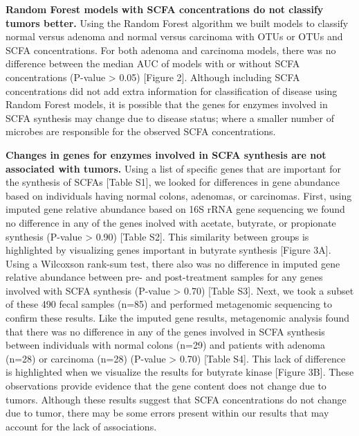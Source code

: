 \documentclass[11pt,]{article}
\begin{document}
\textbf{Random Forest models with SCFA concentrations do not classify
tumors better.} Using the Random Forest algorithm we built models to
classify normal versus adenoma and normal versus carcinoma with OTUs or
OTUs and SCFA concentrations. For both adenoma and carcinoma models,
there was no difference between the median AUC of models with or without
SCFA concentrations (P-value \textgreater{} 0.05) {[}Figure 2{]}.
Although including SCFA concentrations did not add extra information for
classification of disease using Random Forest models, it is possible
that the genes for enzymes involved in SCFA synthesis may change due to
disease status; where a smaller number of microbes are responsible for
the observed SCFA concentrations.

\textbf{Changes in genes for enzymes involved in SCFA synthesis are not
associated with tumors.} Using a list of specific genes that are
important for the synthesis of SCFAs {[}Table S1{]}, we looked for
differences in gene abundance based on individuals having normal colons,
adenomas, or carcinomas. First, using imputed gene relative abundance
based on 16S rRNA gene sequencing we found no difference in any of the
genes inolved with acetate, butyrate, or propionate synthesis (P-value
\textgreater{} 0.90) {[}Table S2{]}. This similarity between groups is
highlighted by visualizing genes important in butyrate synthesis
{[}Figure 3A{]}. Using a Wilcoxson rank-sum test, there also was no
difference in imputed gene relative abundance between pre- and
post-treatment samples for any genes involved with SCFA synthesis
(P-value \textgreater{} 0.70) {[}Table S3{]}. Next, we took a subset of
these 490 fecal samples (n=85) and performed metagenomic sequencing to
confirm these results. Like the imputed gene results, metagenomic
analysis found that there was no difference in any of the genes involved
in SCFA synthesis between individuals with normal colons (n=29) and
patients with adenoma (n=28) or carcinoma (n=28) (P-value \textgreater{}
0.70) {[}Table S4{]}. This lack of difference is highlighted when we
visualize the results for butyrate kinase {[}Figure 3B{]}. These
observations provide evidence that the gene content does not change due
to tumors. Although these results suggest that SCFA concentrations do
not change due to tumor, there may be some errors present within our
results that may account for the lack of associations.
\end{document}
